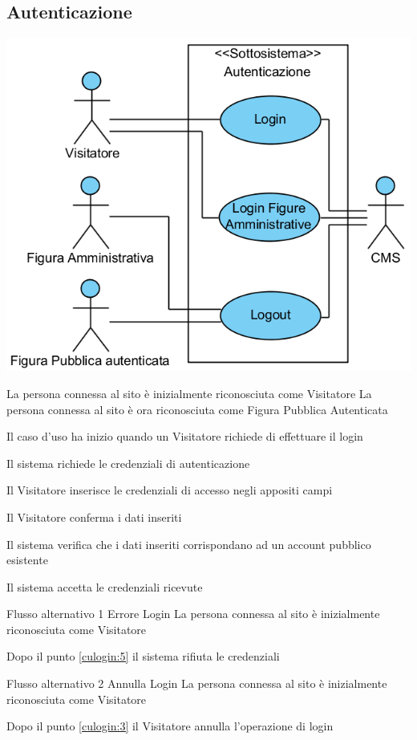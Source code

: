 \subsection{Autenticazione}
\begin{center}
   \includegraphics[width=\textwidth]{assets/visualParadigm/cu/Autenticazione}
\end{center}
%
{}%
{La persona connessa al sito è inizialmente riconosciuta come Visitatore}%
{La persona connessa al sito è ora riconosciuta come Figura Pubblica Autenticata}%
{\begin{enumCU}
	\item Il caso d'uso ha inizio quando un Visitatore richiede di effettuare il login 
	\item Il sistema richiede le credenziali di autenticazione
	\item Il Visitatore inserisce le credenziali di accesso negli appositi campi \label{culogin:3}
	\item Il Visitatore conferma i dati inseriti
	\item Il sistema verifica che i dati inseriti corrispondano ad un account pubblico esistente\label{culogin:5}
	\item Il sistema accetta le credenziali ricevute
\end{enumCU}}%
%
{Flusso alternativo 1}%
{Errore Login}%
{La persona connessa al sito è inizialmente riconosciuta come Visitatore}%
{\postNulle}%
{\begin{enumCU}
	\item Dopo il punto \ref{culogin:5} il sistema rifiuta le credenziali
\end{enumCU}}%
%
{Flusso alternativo 2}%
{Annulla Login}%
{La persona connessa al sito è inizialmente riconosciuta come Visitatore}%
{\postNulle}%
{\begin{enumCU}
		\item Dopo il punto \ref{culogin:3} il Visitatore annulla l'operazione di login
\end{enumCU}}%

